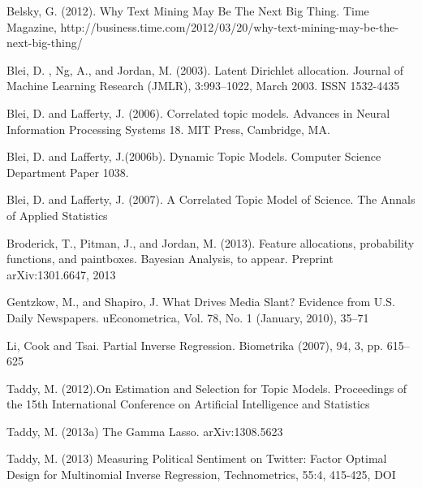 \documentclass[12pt]{article}
\begin{document}


\begin{thebibliography}{99}

 Belsky, G. (2012). Why Text Mining May Be The Next Big Thing. Time Magazine, http://business.time.com/2012/03/20/why-text-mining-may-be-the-next-big-thing/

 Blei, D. , Ng, A., and Jordan, M. (2003). Latent Dirichlet allocation. Journal of Machine Learning Research (JMLR), 3:993–1022, March 2003. ISSN 1532-4435

 Blei, D. and Lafferty, J. (2006). Correlated topic models. Advances in Neural Information Processing Systems 18. MIT Press, Cambridge, MA.

 Blei, D. and Lafferty, J.(2006b). Dynamic Topic Models. Computer Science Department Paper 1038.

  Blei, D. and Lafferty, J. (2007). A Correlated Topic Model of Science. The Annals of Applied Statistics

 Broderick, T.,  Pitman, J.,  and Jordan, M. (2013). Feature allocations, probability functions, and paintboxes. Bayesian Analysis, to appear. Preprint arXiv:1301.6647, 2013

 Gentzkow, M., and  Shapiro, J. What Drives Media Slant? Evidence from U.S. Daily Newspapers. uEconometrica, Vol. 78, No. 1 (January, 2010), 35–71

  Li, Cook  and Tsai. Partial Inverse Regression. Biometrika (2007), 94, 3, pp. 615–625

 Taddy, M. (2012).On Estimation and Selection for Topic Models.  Proceedings of the 15th International Conference on Artificial Intelligence and Statistics

 Taddy, M.  (2013a) The Gamma Lasso. arXiv:1308.5623

  Taddy, M.  (2013) Measuring Political Sentiment on Twitter: Factor Optimal Design for Multinomial
Inverse Regression, Technometrics, 55:4, 415-425, DOI


\end{thebibliography}
\end{document}
